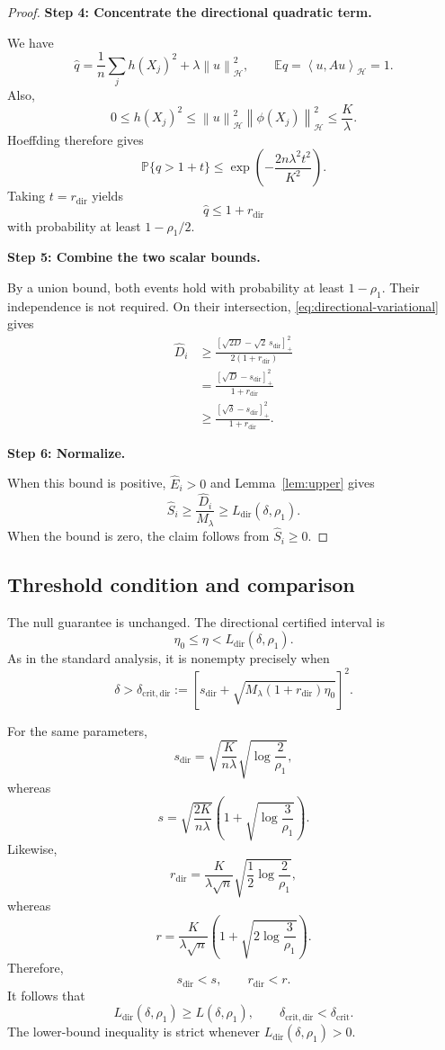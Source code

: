 \documentclass[11pt]{article}
\newcommand{\HH}{\mathcal H}
\newcommand{\E}{\mathbb E}
\newcommand{\Prob}{\mathbb P}
\newcommand{\inner}[2]{\left\langle #1,#2\right\rangle_{\HH}}
\newcommand{\norm}[1]{\left\lVert #1\right\rVert_{\HH}}
\newcommand{\proofstep}[1]{%
  \par\smallskip
  \noindent\textbf{#1}\enspace\ignorespaces
}
\begin{document}
\begin{proof}
\proofstep{Step 4: Concentrate the directional quadratic term.}
We have
\[
\widehat q
=\frac1n\sum_jh(X_j)^2+\lambda\norm{u}^2,
\qquad
\E\widehat q=\inner{u}{Au}=1.
\]
Also,
\[
0\le h(X_j)^2
\le\norm{u}^2\norm{\phi(X_j)}^2
\le\frac K\lambda.
\]
Hoeffding therefore gives
\[
\Prob\{\widehat q>1+t\}
\le\exp\left(-\frac{2n\lambda^2t^2}{K^2}\right).
\]
Taking $t=r_{\mathrm{dir}}$ yields
\[
\widehat q\le1+r_{\mathrm{dir}}
\]
with probability at least $1-\rho_1/2$.

\proofstep{Step 5: Combine the two scalar bounds.}
By a union bound, both events hold with probability
at least $1-\rho_1$. Their independence is not required.
On their intersection, \eqref{eq:directional-variational}
gives
\[
\begin{aligned}
\widehat D_i
&\ge
\frac{[\sqrt{2D}-\sqrt2\,s_{\mathrm{dir}}]_+^2}
{2(1+r_{\mathrm{dir}})}\\
&=
\frac{[\sqrt D-s_{\mathrm{dir}}]_+^2}
{1+r_{\mathrm{dir}}}\\
&\ge
\frac{[\sqrt\delta-s_{\mathrm{dir}}]_+^2}
{1+r_{\mathrm{dir}}}.
\end{aligned}
\]

\proofstep{Step 6: Normalize.}
When this bound is positive, $\widehat E_i>0$ and
Lemma~\ref{lem:upper} gives
\[
\widehat S_i
\ge\frac{\widehat D_i}{M_\lambda}
\ge L_{\mathrm{dir}}(\delta,\rho_1).
\]
When the bound is zero, the claim follows from
$\widehat S_i\ge0$.
\end{proof}

\subsection{Threshold condition and comparison}

The null guarantee is unchanged.
The directional certified interval is
\[
\eta_0\le\eta<L_{\mathrm{dir}}(\delta,\rho_1).
\]
As in the standard analysis, it is nonempty precisely when
\begin{equation}
\boxed{
\delta>
\delta_{\mathrm{crit,dir}}
:=
\left[
s_{\mathrm{dir}}
+\sqrt{M_\lambda(1+r_{\mathrm{dir}})\eta_0}
\right]^2.
}
\label{eq:critical-directional}
\end{equation}

For the same parameters,
\[
s_{\mathrm{dir}}
=
\sqrt{\frac K{n\lambda}}
\sqrt{\log\frac2{\rho_1}},
\]
whereas
\[
s
=
\sqrt{\frac{2K}{n\lambda}}
\left(1+\sqrt{\log\frac3{\rho_1}}\right).
\]
Likewise,
\[
r_{\mathrm{dir}}
=
\frac K{\lambda\sqrt n}
\sqrt{\frac12\log\frac2{\rho_1}},
\]
whereas
\[
r
=
\frac K{\lambda\sqrt n}
\left(1+\sqrt{2\log\frac3{\rho_1}}\right).
\]
Therefore,
\[
s_{\mathrm{dir}}<s,
\qquad
r_{\mathrm{dir}}<r.
\]
It follows that
\[
L_{\mathrm{dir}}(\delta,\rho_1)
\ge L(\delta,\rho_1),
\qquad
\delta_{\mathrm{crit,dir}}
<
\delta_{\mathrm{crit}}.
\]
The lower-bound inequality is strict whenever
$L_{\mathrm{dir}}(\delta,\rho_1)>0$.
\end{document}

